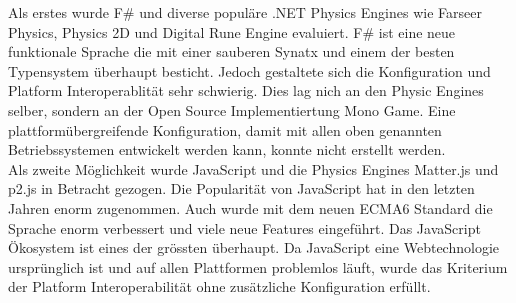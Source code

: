      Als erstes wurde F# und diverse populäre .NET Physics Engines wie Farseer Physics, Physics 2D und Digital Rune Engine evaluiert.
     F# ist eine neue funktionale Sprache die mit einer sauberen Synatx und einem der besten Typensystem überhaupt besticht.
     Jedoch gestaltete sich die Konfiguration und Platform Interoperablität sehr schwierig. Dies lag nich an den Physic Engines selber,
     sondern an der Open Source Implementiertung Mono Game. Eine plattformübergreifende Konfiguration,
     damit mit allen oben genannten Betriebssystemen entwickelt werden kann, konnte nicht erstellt werden.\\
     Als zweite Möglichkeit wurde JavaScript und die Physics Engines Matter.js und p2.js in Betracht gezogen.
     Die Popularität von JavaScript hat in den letzten Jahren enorm zugenommen.
     Auch wurde mit dem neuen ECMA6 Standard die Sprache enorm verbessert und viele neue Features eingeführt. Das JavaScript Ökosystem ist eines der grössten überhaupt.
     Da JavaScript eine Webtechnologie ursprünglich ist und auf allen Plattformen problemlos läuft, wurde das Kriterium der Platform Interoperabilität ohne zusätzliche Konfiguration erfüllt.




